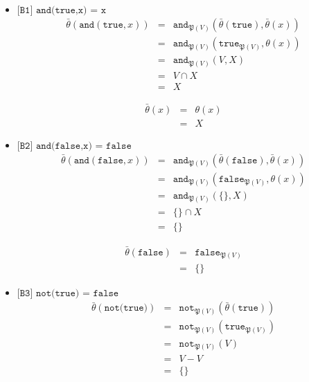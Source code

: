 \documentclass[a4paper,11pt]{article}
\begin{document}
\begin{itemize}

\item{$\texttt{[B1] and(true,x) = x}$}
\begin{eqnarray*}
\bar \theta(\texttt{and}(\texttt{true}, x)) & = & \texttt{and}_{\mathfrak{P}(V)}(\bar \theta(\texttt{true}), \bar \theta(x)) \\
                                            & = & \texttt{and}_{\mathfrak{P}(V)}(\texttt{true}_{\mathfrak{P}(V)}, \theta(x)) \\
                                            & = & \texttt{and}_{\mathfrak{P}(V)}(V,X) \\
                                            & = & V \cap X \\
                                            & = & X
\end{eqnarray*}

\begin{eqnarray*}
\bar \theta(x) & = & \theta(x) \\
               & = & X
\end{eqnarray*}

\item{$\texttt{[B2] and(false,x) = false}$}
\begin{eqnarray*}
\bar \theta(\texttt{and}(\texttt{false}, x)) & = & \texttt{and}_{\mathfrak{P}(V)}(\bar \theta(\texttt{false}), \bar \theta(x)) \\
                                             & = & \texttt{and}_{\mathfrak{P}(V)}(\texttt{false}_{\mathfrak{P}(V)}, \theta(x)) \\
                                             & = & \texttt{and}_{\mathfrak{P}(V)}(\{\},X) \\
                                             & = & \{\} \cap X \\
                                             & = & \{\}
\end{eqnarray*}

\begin{eqnarray*}
\bar \theta(\texttt{false}) & = & \texttt{false}_{\mathfrak{P}(V)} \\
                            & = & \{\}
\end{eqnarray*}

\item{$\texttt{[B3] not(true) = false}$}
\begin{eqnarray*}
\bar \theta(\texttt{not(true)}) & = & \texttt{not}_{\mathfrak{P}(V)}(\bar \theta(\texttt{true})) \\
                                & = & \texttt{not}_{\mathfrak{P}(V)}(\texttt{true}_{\mathfrak{P}(V)}) \\
                                & = & \texttt{not}_{\mathfrak{P}(V)}(V) \\
                                & = & V - V \\
                                & = & \{\}
\end{eqnarray*}


\end{itemize}
\end{document}
